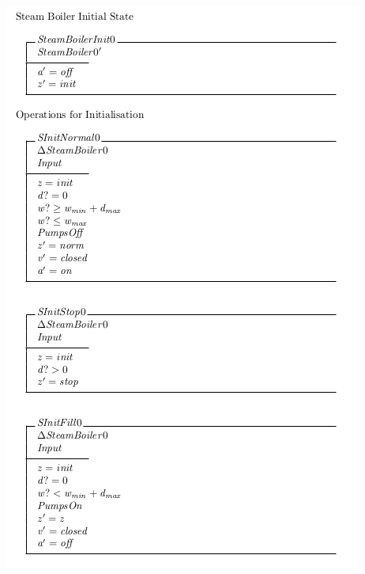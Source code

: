 \begin{center}
    \noindent \includegraphics[scale=0.8]{examples/steamboiler/0b.png}
\end{center}

